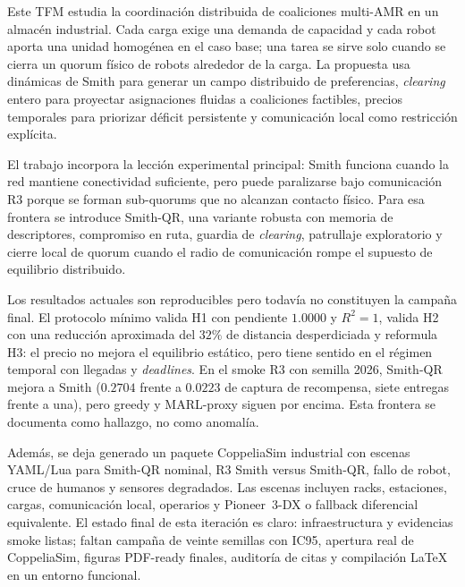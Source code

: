 \documentclass[12pt,a4paper]{article}
\begin{document}
\hypersetup{pageanchor=false}
\makeviucover
\hypersetup{pageanchor=true}


\thispagestyle{frontmatter}
\null
\clearpage

\begin{viuabstract}
Este TFM estudia la coordinación distribuida de coaliciones multi-AMR en un almacén
industrial. Cada carga exige una demanda de capacidad y cada robot aporta una unidad
homogénea en el caso base; una tarea se sirve solo cuando se cierra un quorum físico de
robots alrededor de la carga. La propuesta usa dinámicas de Smith para generar un campo
distribuido de preferencias, \emph{clearing} entero para proyectar asignaciones fluidas a
coaliciones factibles, precios temporales para priorizar déficit persistente y
comunicación local como restricción explícita.

El trabajo incorpora la lección experimental principal: Smith funciona cuando la red
mantiene conectividad suficiente, pero puede paralizarse bajo comunicación R3 porque se
forman sub-quorums que no alcanzan contacto físico. Para esa frontera se introduce
Smith-QR, una variante robusta con memoria de descriptores, compromiso en ruta, guardia
de \emph{clearing}, patrullaje exploratorio y cierre local de quorum cuando el radio de
comunicación rompe el supuesto de equilibrio distribuido.

Los resultados actuales son reproducibles pero todavía no constituyen la campaña final.
El protocolo mínimo valida H1 con pendiente $1.0000$ y $R^2=1$, valida H2 con una
reducción aproximada del $32\%$ de distancia desperdiciada y reformula H3: el precio no
mejora el equilibrio estático, pero tiene sentido en el régimen temporal con llegadas y
\emph{deadlines}. En el smoke R3 con semilla 2026, Smith-QR mejora a Smith
(\(0.2704\) frente a \(0.0223\) de captura de recompensa, siete entregas frente a una),
pero greedy y MARL-proxy siguen por encima. Esta frontera se documenta como hallazgo,
no como anomalía.

Además, se deja generado un paquete CoppeliaSim industrial con escenas YAML/Lua para
Smith-QR nominal, R3 Smith versus Smith-QR, fallo de robot, cruce de humanos y sensores
degradados. Las escenas incluyen racks, estaciones, cargas, comunicación local,
operarios y Pioneer~3-DX o fallback diferencial equivalente. El estado final de esta
iteración es claro: infraestructura y evidencias smoke listas; faltan campaña de veinte
semillas con IC95, apertura real de CoppeliaSim, figuras PDF-ready finales, auditoría de
citas y compilación LaTeX en un entorno funcional.


\end{viuabstract}
\end{document}
